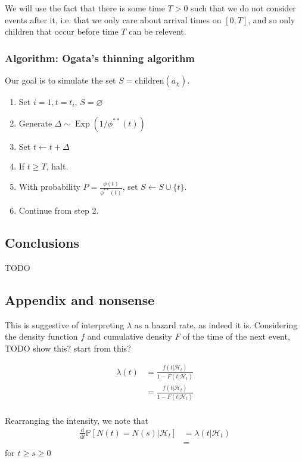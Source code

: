 \documentclass[11pt]{article}
\providecommand{\tightlist}{%
      \setlength{\itemsep}{0pt}\setlength{\parskip}{0pt}}
\newcommand{\dd}{\mathrm{d}}
\newcommand{\bb}[1]{\mathbb{#1}}
\newcommand{\cc}[1]{\mathcal{#1}}
\renewcommand{\cc}[1]{\mathcal{#1}}
\begin{document}
We will use the fact that there is some time \(T>0\) such that we do not
consider events after it, i.e. that we only care about arrival times on
\([0,T]\), and so only children that occur before time \(T\) can be
relevent.

\subsubsection{Algorithm: Ogata's thinning
algorithm}\label{algorithm-ogatas-thinning-algorithm}

Our goal is to simulate the set \(S=\mathrm{children}(a_\chi)\).

\begin{enumerate}
\def\labelenumi{\arabic{enumi}.}
\tightlist
\item
  Set \(i=1, t=t_i\), \(S=\varnothing\)
\item
  Generate \(\Delta\sim \operatorname{Exp}(1/\phi^{**}(t))\)
\item
  Set \(t\leftarrow t+\Delta\)
\item
  If \(t\geq T\), halt.
\item
  With probability \(P=\frac{\phi(t)}{\phi^{**}(t)}\), set
  \(S\leftarrow S\cup \{t\}\).
\item
  Continue from step 2.
\end{enumerate}

    \subsection{Conclusions}\label{conclusions}

    TODO

    \subsection{Appendix and nonsense}\label{appendix-and-nonsense}


    This is suggestive of interpreting \(\lambda\) as a hazard rate, as
indeed it is. Considering the density function \(f\) and cumulative
density \(F\) of the time of the next event, TODO show this? start from
this?

\[\begin{aligned}
\lambda(t)&=\frac{f(t|\cc{H}_t)}{1-F(t|\cc{H}_t)}\\
&=\frac{f(t|\cc{H}_t)}{1-F(t|\cc{H}_t)}\\
\end{aligned}\]

    Rearranging the intensity, we note that \[\begin{aligned}
\frac{\dd}{\dd t} \bb P\left[N(t)=N(s)|\cc{H}_t\right] &= \lambda(t|\cc{H}_t) \\
&= 
\end{aligned}\] for \(t\geq s \geq 0\)
\end{document}
